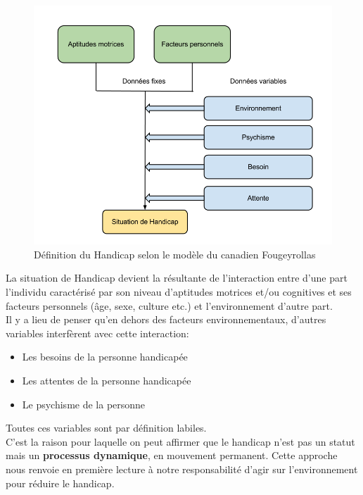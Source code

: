 \begin{figure}[H]
\centering
\includegraphics[scale=0.45]{figures/modele_canadien.png}
\caption{Définition du Handicap selon le modèle du canadien Fougeyrollas}
\label{modele_canadien}
\end{figure}

La situation de Handicap devient la résultante de l'interaction entre d'une part l'individu caractérisé par son niveau d'aptitudes motrices et/ou cognitives et ses facteurs personnels (âge, sexe, culture etc.) et l'environnement d'autre part.  \\
Il y a lieu de penser qu'en dehors des facteurs environnementaux, d'autres variables interfèrent avec cette interaction: 
\begin{itemize}
\item Les besoins de la personne handicapée
\item Les attentes de la personne handicapée
\item Le psychisme de la personne\\
\end{itemize}

Toutes ces variables sont par définition labiles.\\


C'est la raison pour laquelle on peut affirmer que le handicap n'est pas un statut mais un \textbf{processus dynamique}, en mouvement permanent. Cette approche nous renvoie en première lecture à notre responsabilité d'agir sur l'environnement pour réduire le handicap. 



